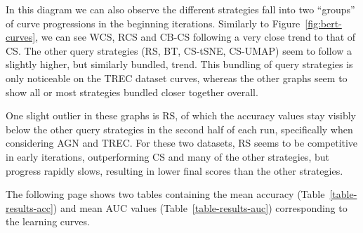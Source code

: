 \documentclass[english,bachelor,ul]{webisthesis} %
\begin{document}
In this diagram we can also observe the different strategies fall into two ``groups'' of curve progressions in the beginning iterations. Similarly to Figure~\ref{fig:bert-curves}, we can see WCS, RCS and CB-CS following a very close trend to that of CS. The other query strategies (RS, BT, CS-tSNE, CS-UMAP) seem to follow a slightly higher, but similarly bundled, trend. This bundling of query strategies is only noticeable on the TREC dataset curves, whereas the other graphs seem to show all or most strategies bundled closer together overall.

One slight outlier in these graphs is RS, of which the accuracy values stay visibly below the other query strategies in the second half of each run, specifically when considering AGN and TREC. For these two datasets, RS seems to be competitive in early iterations, outperforming CS and many of the other strategies, but progress rapidly slows, resulting in lower final scores than the other strategies.


The following page shows two tables containing the mean accuracy (Table~\ref{table-results-acc}) and mean AUC values (Table~\ref{table-results-auc}) corresponding to the learning curves. 

\clearpage \newpage
\end{document}
